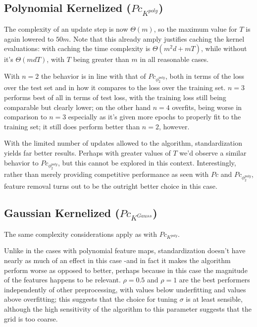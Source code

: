 

\pagebreak{}
\subsection{Polynomial Kernelized ($Pc_{K^{poly}}$)}
The complexity of an update step is now $\Theta(m)$, so the maximum value for $T$ is again lowered to $50m$. Note that this already amply justifies caching the kernel evaluations: with caching the time complexity is $\Theta{}(m^2d + mT)$, while without it's $\Theta{}(mdT)$, with $T$ being greater than $m$ in all reasonable cases.

With $n = 2$ the behavior is in line with that of $Pc_{\phi^{poly}_2}$, both in terms of the loss over the test set and in how it compares to the loss over the training set. $n = 3$ performs best of all in terms of test loss, with the training loss still being comparable but clearly lower; on the other hand $n = 4$ overfits, being worse in comparison to $n = 3$ especially as it's given more epochs to properly fit to the training set; it still does perform better than $n = 2$, however.

With the limited number of updates allowed to the algorithm, standardization yields far better results. Perhaps with greater values of $T$ we'd observe a similar behavior to $Pc_{\phi^{poly}_2}$, but this cannot be explored in this context. Interestingly, rather than merely providing competitive performance as seen with $Pc$ and  $Pc_{\phi^{poly}_2}$, feature removal turns out to be the outright better choice in this case.



\pagebreak{}
\subsection{Gaussian Kernelized ($Pc_{K^{Gauss}}$)}
The same complexity considerations apply as with $Pc_{K^{poly}}$.

Unlike in the cases with polynomial feature maps, standardization doesn't have nearly as much of an effect in this case -and in fact it makes the algorithm perform worse as opposed to better, perhaps because in this case the magnitude of the features happens to be relevant. $\rho{} = 0.5$ and $\rho{} = 1$ are the best performers independently of other preprocessing, with values below underfitting and values above overfitting; this suggests that the choice for tuning $\sigma{}$ is at least sensible, although the high sensitivity of the algorithm to this parameter suggests that the grid is too coarse.

